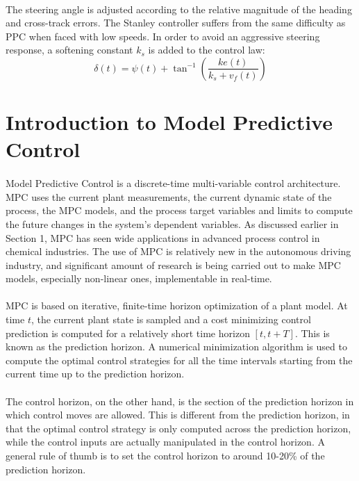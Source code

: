 \paragraph{}
The steering angle is adjusted according to the relative magnitude of the heading and cross-track errors. The Stanley controller suffers from the same difficulty as PPC when faced with low speeds. In order to avoid an aggressive steering response, a softening constant $k_s$ is added to the control law:
$$\delta(t) = \psi(t) + \tan^{-1}\left(\frac{ke(t)}{k_s+v_f(t)}\right)$$

\section{Introduction to Model Predictive Control}
\paragraph{}
Model Predictive Control is a discrete-time multi-variable control architecture. MPC uses the current plant measurements, the current dynamic state of the process, the MPC models, and the process target variables and limits to compute the future changes in the system's dependent variables. As discussed earlier in Section 1, MPC has seen wide applications in advanced process control in chemical industries. The use of MPC is relatively new in the autonomous driving industry, and significant amount of research is being carried out to make MPC models, especially non-linear ones, implementable in real-time.

\paragraph{}
MPC is based on iterative, finite-time horizon optimization of a plant model. At time $t$, the current plant state is sampled and a cost minimizing control prediction is computed for a relatively short time horizon $[t, t+T]$. This is known as the prediction horizon. A numerical minimization algorithm is used to compute the optimal control strategies for all the time intervals starting from the current time up to the prediction horizon. 

\paragraph{}
The control horizon, on the other hand, is the section of the prediction horizon in which control moves are allowed. This is different from the prediction horizon, in that the optimal control strategy is only computed across the prediction horizon, while the control inputs are actually manipulated in the control horizon. A general rule of thumb is to set the control horizon to around 10-20\% of the prediction horizon.

